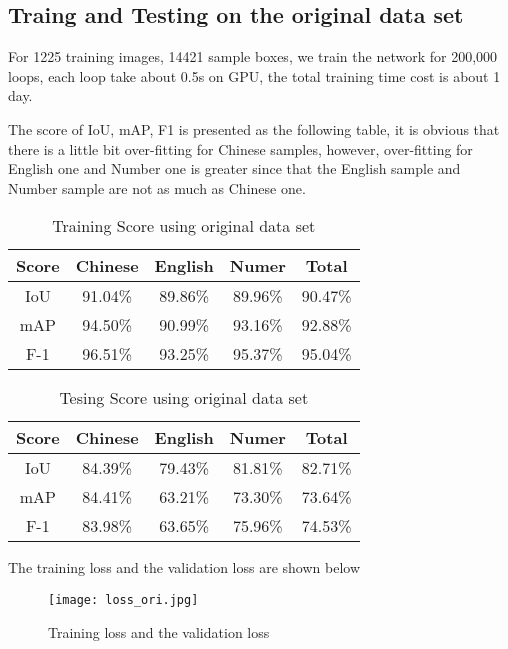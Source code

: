 \documentclass{IEEEtran}
\begin{document}
\subsection{Traing and Testing on the original data set}
For 1225 training images, 14421 sample boxes, we train the network for 200,000 loops, each loop take about 0.5s on GPU, the total training time cost is about 1 day.

The score of IoU, mAP, F1 is presented as the following table, it is obvious that there is a little bit over-fitting for Chinese samples, however, over-fitting for English one and Number one is greater since that the English sample and Number sample are not as much as Chinese one.

\begin{table}[h]
    \centering\caption{Training Score using original data set}
    \begin{tabular}{ccccc}
        \toprule
        Score & Chinese  & English & Numer & Total \\
        \midrule
        IoU & 91.04\% & 89.86\% & 89.96\% & 90.47\%\\
        mAP & 94.50\% & 90.99\% & 93.16\% & 92.88\%\\
        F-1 & 96.51\% & 93.25\% & 95.37\% & 95.04\%\\
        \bottomrule
    \end{tabular}
\end{table}
\begin{table}[h]
    \centering\caption{Tesing Score using original data set}
    \begin{tabular}{ccccc}
        \toprule
        Score & Chinese  & English & Numer & Total \\
        \midrule
        IoU & 84.39\% &79.43\% & 81.81\% & 82.71\%\\
        mAP & 84.41\% & 63.21\% & 73.30\% & 73.64\%\\
        F-1 & 83.98\% & 63.65\% & 75.96\% & 74.53\%\\
        \bottomrule
    \end{tabular}
\end{table}

The training loss and the validation loss are shown below

\begin{figure}[h]
    \centering
    \texttt{[image: loss\_ori.jpg]}
    \caption{Training loss and the validation loss}
    \label{Ori}
\end{figure}
\end{document}

